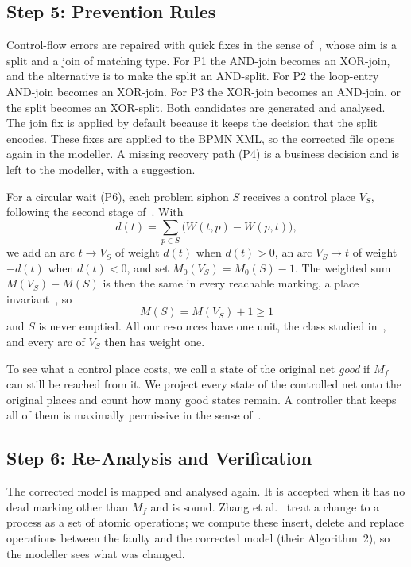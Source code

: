 \documentclass[conference]{IEEEtran}
\begin{document}
\subsection{Step 5: Prevention Rules}
Control-flow errors are repaired with quick fixes in the sense of~\cite{kraeuter}, whose aim is a split and a
join of matching type. For P1 the AND-join becomes an XOR-join, and the alternative is to make the split an
AND-split. For P2 the loop-entry AND-join becomes an XOR-join. For P3 the XOR-join becomes an AND-join, or the
split becomes an XOR-split. Both candidates are generated and analysed. The join fix is applied by default
because it keeps the decision that the split encodes. These fixes are applied to the BPMN XML, so the corrected
file opens again in the modeller. A missing recovery path (P4) is a business decision and is left to the
modeller, with a suggestion.

For a circular wait (P6), each problem siphon $S$ receives a control place $V_S$, following the second stage
of~\cite{wang}. With
\begin{equation}
d(t)=\sum_{p\in S}\big(W(t,p)-W(p,t)\big),
\end{equation}
we add an arc $t\to V_S$ of weight $d(t)$ when $d(t)>0$, an arc $V_S\to t$ of weight $-d(t)$ when $d(t)<0$, and
set $M_0(V_S)=M_0(S)-1$. The weighted sum $M(V_S)-M(S)$ is then the same in every reachable marking, a place
invariant~\cite{murata}, so
\begin{equation}
M(S)=M(V_S)+1\ge 1
\end{equation}
and $S$ is never emptied. All our resources have one unit, the class studied in~\cite{wang}, and every arc of
$V_S$ then has weight one.

To see what a control place costs, we call a state of the original net \emph{good} if $M_f$ can still be
reached from it. We project every state of the controlled net onto the original places and count how many good
states remain. A controller that keeps all of them is maximally permissive in the sense of~\cite{wang}.

\subsection{Step 6: Re-Analysis and Verification}
The corrected model is mapped and analysed again. It is accepted when it has no dead marking other than $M_f$
and is sound. Zhang et al.~\cite{zhang} treat a change to a process as a set of atomic operations; we compute
these insert, delete and replace operations between the faulty and the corrected model (their Algorithm~2), so
the modeller sees what was changed.
\end{document}
